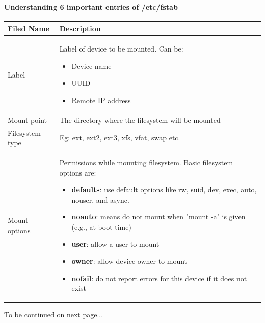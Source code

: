 \begin{flushleft}
\paragraph{Understanding 6 important entries of /etc/fstab}
\bigskip
\begin{tabulary}{1.0\textwidth}{|p{5em}|p{23em}|}
	\toprule
	\textbf{Filed Name} & \textbf{Description}\\
	\midrule
	Label & Label of device to be mounted. Can be:
	\begin{itemize}
		\item Device name
		\item UUID
		\item Remote IP address
	\end{itemize}\\
	\hline
	Mount point & The directory where the filesystem will be mounted \\
	\hline
	Filesystem type & Eg: ext, ext2, ext3, xfs, vfat, swap etc. \\
	\hline
	Mount options & Permissions while mounting filesystem. Basic filesystem options are:
	\begin{itemize}
		\item \textbf{defaults}: use default options like rw, suid, dev, exec, auto, nouser, and async.
		\item \textbf{noauto}: means do not mount when "mount -a" is given (e.g., at boot time)
		\item \textbf{user}: allow a user to mount
		\item \textbf{owner}: allow device owner to mount
		\item \textbf{nofail}: do not report errors for this device if it does not exist
	\end{itemize} \\

	\bottomrule
\end{tabulary}
	To be continued on next page...

\newpage

\end{flushleft}
